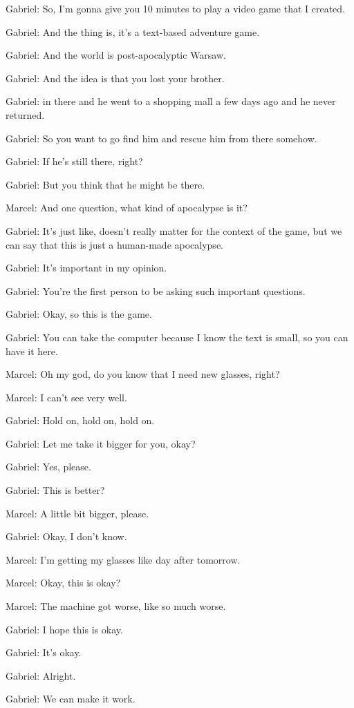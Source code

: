 Gabriel: So, I'm gonna give you 10 minutes to play a video game that I created.

Gabriel: And the thing is, it's a text-based adventure game.

Gabriel: And the world is post-apocalyptic Warsaw.

Gabriel: And the idea is that you lost your brother.

Gabriel: in there and he went to a shopping mall a few days ago and he never returned.

Gabriel: So you want to go find him and rescue him from there somehow.

Gabriel: If he's still there, right?

Gabriel: But you think that he might be there.

Marcel: And one question, what kind of apocalypse is it?

Gabriel: It's just like, doesn't really matter for the context of the game, but we can say that this is just a human-made apocalypse.

Gabriel: It's important in my opinion.

Gabriel: You're the first person to be asking such important questions.

Gabriel: Okay, so this is the game.

Gabriel: You can take the computer because I know the text is small, so you can have it here.

Marcel: Oh my god, do you know that I need new glasses, right?

Marcel: I can't see very well.

Gabriel: Hold on, hold on, hold on.

Gabriel: Let me take it bigger for you, okay?

Gabriel: Yes, please.

Gabriel: This is better?

Marcel: A little bit bigger, please.

Gabriel: Okay, I don't know.

Marcel: I'm getting my glasses like day after tomorrow.

Marcel: Okay, this is okay?

Marcel: The machine got worse, like so much worse.

Gabriel: I hope this is okay.

Gabriel: It's okay.

Gabriel: Alright.

Gabriel: We can make it work.

